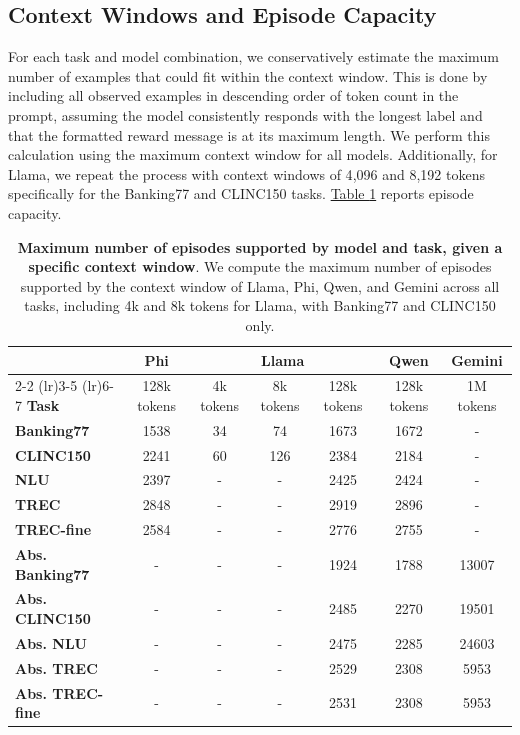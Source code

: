 \documentclass{article}
\theoremstyle{plain}
\theoremstyle{definition}
\theoremstyle{remark}
\newcommand{\autoreftab}[1]{\hyperref[#1]{Table \ref*{#1}}}
\newcommand{\llama}{Llama\xspace}
\newcommand{\phillm}{Phi\xspace}
\newcommand{\qwen}{Qwen\xspace}
\newcommand{\gemini}{Gemini\xspace}
\newcommand{\banking}{Banking77\xspace}
\newcommand{\clinic}{CLINC150\xspace}
\newcommand{\trec}{TREC\xspace}
\newcommand{\trecfine}{TREC-fine\xspace}
\newcommand{\nlu}{NLU\xspace}
\begin{document}
\subsection{Context Windows and Episode Capacity}\label{appendix:exp_setup:data}
For each task and model combination, we conservatively estimate the maximum number of examples that could fit within the context window. This is done by including all observed examples in descending order of token count in the prompt, assuming the model consistently responds with the longest label and that the formatted reward message is at its maximum length. We perform this calculation using the maximum context window for all models. Additionally, for \llama, we repeat the process with context windows of 4{,}096 and 8{,}192 tokens specifically for the \banking and \clinic tasks.
\autoreftab{tab:appendix_max_examples_per_task_model} reports episode capacity.
\begin{table}[!t]
\caption{\textbf{Maximum number of episodes supported by model and task, given a specific context window}. We compute the maximum number of episodes supported by the context window of \llama, \phillm, \qwen, and \gemini across all tasks, including 4k and 8k tokens for \llama, with \banking and \clinic only.}
\centering
\footnotesize
\begin{tabular}{lcccccc}
\toprule
& \textbf{\phillm} & \multicolumn{3}{c}{\textbf{\llama}} & \textbf{\qwen} & \textbf{\gemini} \\
\cmidrule(lr){2-2} \cmidrule(lr){3-5} \cmidrule(lr){6-7}
\textbf{Task} & 128k tokens & 4k tokens & 8k tokens & 128k tokens & 128k tokens & 1M tokens \\
\midrule
\textbf{\banking}   & 1538  & 34 & 74 & 1673 & 1672 & - \\
\textbf{\clinic}    & 2241  & 60 & 126 & 2384 & 2184 & - \\
\textbf{\nlu}       & 2397  & -  & -   & 2425 & 2424 & - \\
\textbf{\trec}      & 2848  & -  & -   & 2919 & 2896 & - \\
\textbf{\trecfine}  & 2584  & -  & -   & 2776 & 2755 & - \\
\midrule
\textbf{Abs. \banking}   & -  & - & - & 1924 & 1788 & 13007 \\
\textbf{Abs. \clinic}    & -  & - & - & 2485 & 2270 & 19501 \\
\textbf{Abs. \nlu}       & -  & - & - & 2475 & 2285 & 24603 \\
\textbf{Abs. \trec}      & -  & - & - & 2529 & 2308 & 5953 \\
\textbf{Abs. \trecfine}  & -  & - & - & 2531 & 2308 & 5953 \\
\midrule[\heavyrulewidth]
\end{tabular}
\label{tab:appendix_max_examples_per_task_model}
\end{table}
\end{document}
